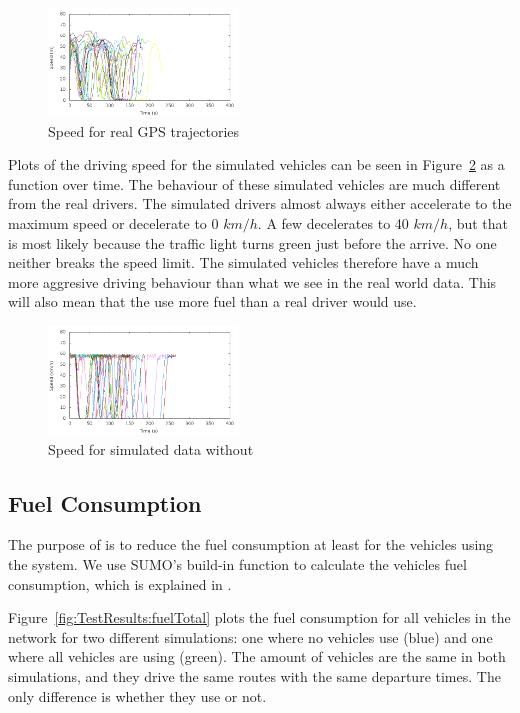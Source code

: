 \begin{figure}[htb]
\includegraphics[width=0.45\textwidth]{../images/Real/RealSpeed.png}
\caption{Speed for real GPS trajectories}
\label{fig:TestResults:RealSpeed}
\end{figure}

Plots of the driving speed for the simulated vehicles can be seen in Figure~\ref{fig:TestResults:speed0} as a function over time.
The behaviour of these simulated vehicles are much different from the real drivers.
The simulated drivers almost always either accelerate to the maximum speed or decelerate to 0 $km/h$. 
A few decelerates to 40 $km/h$, but that is most likely because the traffic light turns green just before the arrive.
No one neither breaks the speed limit.
The simulated vehicles therefore have a much more aggresive driving behaviour than what we see in the real world data.
This will also mean that the use more fuel than a real driver would use.

\begin{figure}[htb]
\includegraphics[width=0.45\textwidth]{../images/tp0c1_0/speedUncontrolled0.png}
\caption{Speed for simulated data without \tech}
\label{fig:TestResults:speed0}
\end{figure}

\subsection{Fuel Consumption}
The purpose of \tech is to reduce the fuel consumption at least for the vehicles using the system. 
We use SUMO's build-in function to calculate the vehicles fuel consumption, which is explained in \cite{SUMOFuel}.

Figure~\ref{fig:TestResults:fuelTotal} plots the fuel consumption for all vehicles in the network for two different simulations: one where no vehicles use \tech (blue) and one where all vehicles are using \tech (green).
The amount of vehicles are the same in both simulations, and they drive the same routes with the same departure times. 
The only difference is whether they use \tech or not.

